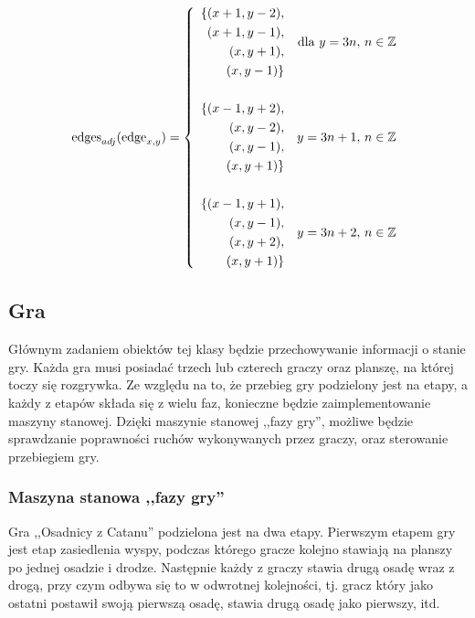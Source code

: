 \documentclass[a4paper,12pt]{article}
\begin{document}
\begin{equation}
  \text{edges}_{adj}(\text{edge}_{x,y})=
  \left\{
    \begin{array}{l r@{,~} l}
      \begin{aligned}
        \{
        (x+1, y-2), \\
        (x+1, y-1), \\
        (x, y+1), \\
        (x, y-1)
        \}
      \end{aligned} & \mbox{dla } y=3n & n\in\mathbb{Z} \\[40pt]
      \begin{aligned}
        \{
        (x-1, y+2), \\
        (x, y-2), \\
        (x, y-1), \\
        (x, y+1)
        \}
      \end{aligned} & y=3n+1 & n\in\mathbb{Z} \\[40pt]
      \begin{aligned}
        \{
        (x-1, y+1), \\
        (x, y-1), \\
        (x, y+2), \\
        (x, y+1)
        \}
      \end{aligned} & y=3n+2 & n\in\mathbb{Z} \\
    \end{array} \right.
  \label{edgeedges}
\end{equation}

\subsection{Gra}
Głównym zadaniem obiektów tej klasy będzie przechowywanie informacji o
stanie gry. Każda gra musi posiadać trzech lub czterech graczy oraz
planszę, na której toczy się rozgrywka. Ze względu na to, że przebieg
gry podzielony jest na etapy, a każdy z etapów składa się z wielu faz,
konieczne będzie zaimplementowanie maszyny stanowej. Dzięki maszynie
stanowej ,,fazy gry'', możliwe będzie sprawdzanie poprawności ruchów
wykonywanych przez graczy, oraz sterowanie przebiegiem gry.

\subsubsection{Maszyna stanowa ,,fazy gry''}
Gra ,,Osadnicy z Catanu'' podzielona jest na dwa etapy. Pierwszym
etapem gry jest etap zasiedlenia wyspy, podczas którego gracze kolejno
stawiają na planszy po jednej osadzie i drodze. Następnie każdy z
graczy stawia drugą osadę wraz z drogą, przy czym odbywa się to w
odwrotnej kolejności, tj. gracz który jako ostatni postawił swoją
pierwszą osadę, stawia drugą osadę jako pierwszy, itd.
\end{document}
